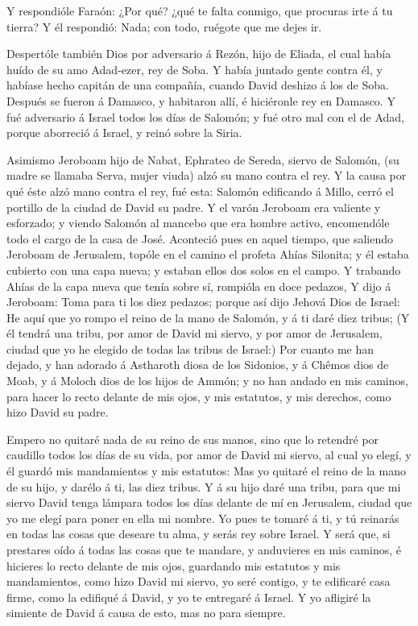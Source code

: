  Y respondióle Faraón: ¿Por qué? ¿qué te falta conmigo, que
procuras irte á tu tierra? Y él respondió: Nada; con todo, ruégote que
me dejes ir.

 Despertóle también Dios por adversario á Rezón, hijo de
Eliada, el cual había huído de su amo Adad-ezer, rey de Soba.
 Y había juntado gente contra él, y habíase hecho capitán
de una compañía, cuando David deshizo á los de Soba. Después se fueron á
Damasco, y habitaron allí, é hiciéronle rey en Damasco.  Y
fué adversario á Israel todos los días de Salomón; y fué otro mal con el
de Adad, porque aborreció á Israel, y reinó sobre la Siria.

 Asimismo Jeroboam hijo de Nabat, Ephrateo de Sereda,
siervo de Salomón, (su madre se llamaba Serva, mujer viuda) alzó su mano
contra el rey.  Y la causa por qué éste alzó mano contra el
rey, fué esta: Salomón edificando á Millo, cerró el portillo de la
ciudad de David su padre.  Y el varón Jeroboam era valiente
y esforzado; y viendo Salomón al mancebo que era hombre activo,
encomendóle todo el cargo de la casa de José.  Aconteció
pues en aquel tiempo, que saliendo Jeroboam de Jerusalem, topóle en el
camino el profeta Ahías Silonita; y él estaba cubierto con una capa
nueva; y estaban ellos dos solos en el campo.  Y trabando
Ahías de la capa nueva que tenía sobre sí, rompióla en doce pedazos,
 Y dijo á Jeroboam: Toma para ti los diez pedazos; porque
así dijo Jehová Dios de Israel: He aquí que yo rompo el reino de la mano
de Salomón, y á ti daré diez tribus;  (Y él tendrá una
tribu, por amor de David mi siervo, y por amor de Jerusalem, ciudad que
yo he elegido de todas las tribus de Israel:)  Por cuanto
me han dejado, y han adorado á Astharoth diosa de los Sidonios, y á
Chêmos dios de Moab, y á Moloch dios de los hijos de Ammón; y no han
andado en mis caminos, para hacer lo recto delante de mis ojos, y mis
estatutos, y mis derechos, como hizo David su padre.

 Empero no quitaré nada de su reino de sus manos, sino que
lo retendré por caudillo todos los días de su vida, por amor de David mi
siervo, al cual yo elegí, y él guardó mis mandamientos y mis estatutos:
 Mas yo quitaré el reino de la mano de su hijo, y darélo á
ti, las diez tribus.  Y á su hijo daré una tribu, para que
mi siervo David tenga lámpara todos los días delante de mí en Jerusalem,
ciudad que yo me elegí para poner en ella mi nombre.  Yo
pues te tomaré á ti, y tú reinarás en todas las cosas que deseare tu
alma, y serás rey sobre Israel.  Y será que, si prestares
oído á todas las cosas que te mandare, y anduvieres en mis caminos, é
hicieres lo recto delante de mis ojos, guardando mis estatutos y mis
mandamientos, como hizo David mi siervo, yo seré contigo, y te edificaré
casa firme, como la edifiqué á David, y yo te entregaré á Israel.
 Y yo afligiré la simiente de David á causa de esto, mas no
para siempre.

